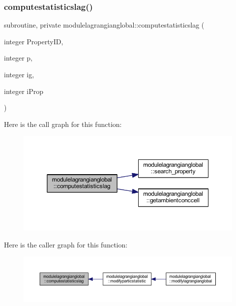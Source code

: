 \mbox{\label{namespacemodulelagrangianglobal_a45258b52ee78ddc9c21fca279fad88da}} 
\subsubsection{\texorpdfstring{computestatisticslag()}{computestatisticslag()}}
{\footnotesize\ttfamily subroutine, private modulelagrangianglobal\+::computestatisticslag (\begin{DoxyParamCaption}\item[{integer}]{Property\+ID,  }\item[{integer}]{p,  }\item[{integer}]{ig,  }\item[{integer}]{i\+Prop }\end{DoxyParamCaption})\hspace{0.3cm}{\ttfamily [private]}}

Here is the call graph for this function\+:\nopagebreak
\begin{figure}[H]
\begin{center}
\leavevmode
\includegraphics[width=350pt]{namespacemodulelagrangianglobal_a45258b52ee78ddc9c21fca279fad88da_cgraph}
\end{center}
\end{figure}
Here is the caller graph for this function\+:\nopagebreak
\begin{figure}[H]
\begin{center}
\leavevmode
\includegraphics[width=350pt]{namespacemodulelagrangianglobal_a45258b52ee78ddc9c21fca279fad88da_icgraph}
\end{center}
\end{figure}
\mbox{\label{namespacemodulelagrangianglobal_a963d16d76b64077295c077df5dcf9e8d}} 
